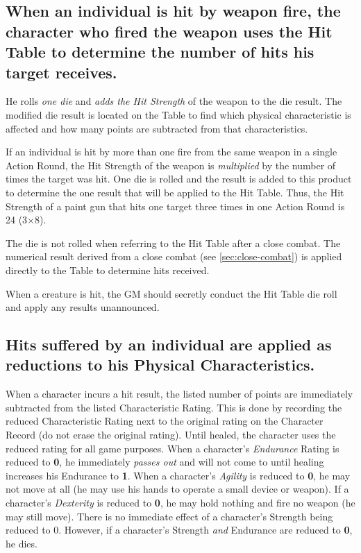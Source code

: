 \subsection[Weapon Fire]{When an individual is hit by weapon fire, the
  character 
  who fired the weapon uses the Hit Table to determine the number of
  hits his target receives.}
\label{sec:hit-table}

He rolls \emph{one die} and \emph{adds the Hit Strength} of the weapon
to the die result. The modified die result is located on the Table to
find which physical characteristic is affected and how many points are
subtracted from that characteristics.

If an individual is hit by more than one fire from the same weapon in
a single Action Round, the Hit Strength of the weapon is
\emph{multiplied} by the number of times the target was hit. One die
is rolled and the result is added to this product to determine the one
result that will be applied to the Hit Table. Thus, the Hit Strength
of a paint gun that hits one target three times in one Action Round is
24 (3$\times$8).

The die is not rolled when referring to the Hit Table after a close
combat. The numerical result derived from a close combat (see
\ref{sec:close-combat}) is applied directly to the Table to determine
hits received.

When a creature is hit, the GM should secretly conduct the Hit Table
die roll and apply any results unannounced.

\subsection[Hits]{Hits suffered by an individual are applied as reductions
  to his Physical Characteristics.}
\label{sec:hits}

When a character incurs a hit result, the listed number of points are
immediately subtracted from the listed Characteristic Rating. This is
done by recording the reduced Characteristic Rating next to the
original rating on the Character Record (do not erase the original
rating). Until healed, the character uses the reduced rating for all
game purposes. When a character's \emph{Endurance} Rating is reduced
to \textbf{0}, he immediately \emph{passes out} and will not come to
until healing increases his Endurance to \textbf{1}. When a
character's \emph{Agility} is reduced to \textbf{0}, he may not move
at all (he may use his hands to operate a small device or weapon). If
a character's \emph{Dexterity} is reduced to \textbf{0}, he may hold
nothing and fire no weapon (he may still move). There is no immediate
effect of a character's Strength being reduced to 0. However, if a
character's Strength \emph{and} Endurance are reduced to \textbf{0},
he dies.

